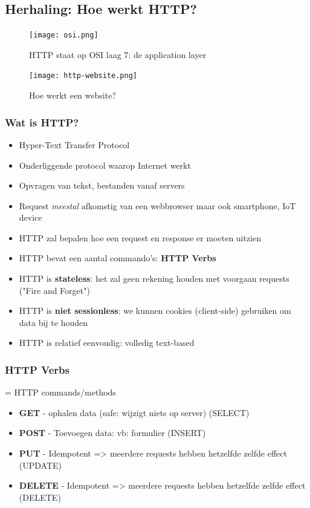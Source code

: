 \documentclass{article}
\newcommand{\bold}[1]{\textbf{#1}}
\begin{document}
\subsection{Herhaling: Hoe werkt HTTP?}
\begin{figure}[H]
    \centering
    \texttt{[image: osi.png]}
    \caption{HTTP staat op OSI laag 7: de application layer}
\end{figure}

\begin{figure}[H]
    \centering
    \texttt{[image: http-website.png]}
    \caption{Hoe werkt een website?}
\end{figure}


\subsubsection{Wat is HTTP?}
\begin{itemize}
    \item Hyper-Text Transfer Protocol
    \item Onderliggende protocol waarop Internet werkt
    \item Opvragen van tekst, bestanden vanaf servers
    \item Request \textit{meestal} afkomstig van een webbrowser maar ook smartphone, IoT device
    \item HTTP zal bepalen hoe een request en response er moeten uitzien
    \item HTTP bevat een aantal commando’s: \bold{HTTP Verbs}
    \item HTTP is \bold{stateless}: het zal geen rekening houden met voorgaan requests ("Fire and Forget")
    \item HTTP is \bold{niet sessionless}: we kunnen cookies (client-side) gebruiken om data bij te houden
    \item HTTP is relatief eenvoudig: volledig text-based
\end{itemize}

\subsubsection{HTTP Verbs}
= HTTP commands/methods

\begin{itemize}
    \item \bold{GET} - ophalen data (safe: wijzigt niets op server) (SELECT)
    \item \bold{POST} - Toevoegen data: vb: formulier (INSERT)
    \item \bold{PUT} - Idempotent => meerdere requests hebben hetzelfde zelfde effect (UPDATE)
    \item \bold{DELETE} - Idempotent => meerdere requests hebben hetzelfde zelfde effect (DELETE)
\end{itemize}
\end{document}
